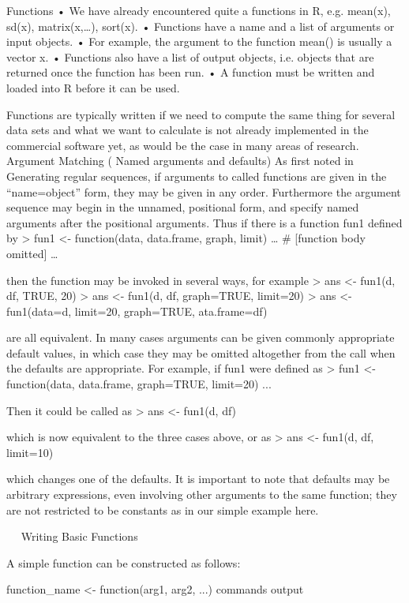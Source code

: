 
Functions
•	We have already encountered quite a functions in R, e.g. mean(x), sd(x), matrix(x,…), sort(x).
•	Functions have a name and a list of arguments or input objects. 
•	For example, the argument to the function mean() is usually a vector x.
•	Functions also have a list of output objects, i.e. objects that are returned once the function has been run.
•	A function must be written and loaded into R before it can be used.

Functions are typically written if we need to compute the same thing for several data sets and what we want to calculate is not already implemented in the commercial software yet, as would be the case in many areas of research.
Argument Matching ( Named arguments and defaults)
As first noted in Generating regular sequences, if arguments to called functions are given in the “name=object” form, they may be given in any order. Furthermore the argument sequence may begin in the unnamed, positional form, and specify named arguments after the positional arguments. 
Thus if there is a function fun1 defined by 
     > fun1 <- function(data, data.frame, graph, limit) {
         …
         # [function body omitted]
         …
         }


then the function may be invoked in several ways, for example 
> ans <- fun1(d, df, TRUE, 20)
> ans <- fun1(d, df, graph=TRUE, limit=20)
> ans <- fun1(data=d, limit=20, graph=TRUE, ata.frame=df)

are all equivalent. 
In many cases arguments can be given commonly appropriate default values, in which case they may be omitted altogether from the call when the defaults are appropriate. For example, if fun1 were defined as 
> fun1 <- function(data, data.frame, graph=TRUE,  limit=20) { ... }

Then it could be called as 
> ans <- fun1(d, df)


which is now equivalent to the three cases above, or as 
> ans <- fun1(d, df, limit=10)


which changes one of the defaults. 
It is important to note that defaults may be arbitrary expressions, even involving other arguments to the same function; they are not restricted to be constants as in our simple example here. 





 
Writing Basic Functions

A simple function can be constructed as follows:

function_name <- function(arg1, arg2, ...){
commands
output
}

